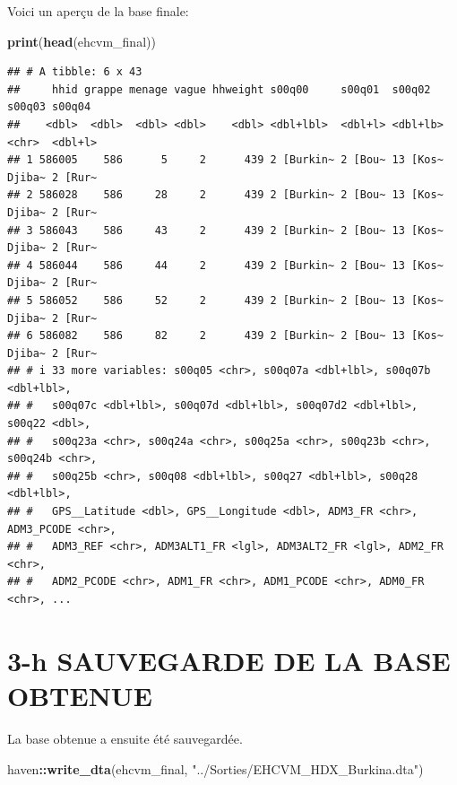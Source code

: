 \documentclass[
]{article}
\newenvironment{Shaded}{\begin{snugshade}}{\end{snugshade}}
\newcommand{\FunctionTok}[1]{\textcolor[rgb]{0.13,0.29,0.53}{\textbf{#1}}}
\newcommand{\NormalTok}[1]{#1}
\newcommand{\SpecialCharTok}[1]{\textcolor[rgb]{0.81,0.36,0.00}{\textbf{#1}}}
\newcommand{\StringTok}[1]{\textcolor[rgb]{0.31,0.60,0.02}{#1}}
\begin{document}
Voici un aperçu de la base finale:

\begin{Shaded}
\begin{Highlighting}[]
\FunctionTok{print}\NormalTok{(}\FunctionTok{head}\NormalTok{(ehcvm\_final))}
\end{Highlighting}
\end{Shaded}

\begin{verbatim}
## # A tibble: 6 x 43
##     hhid grappe menage vague hhweight s00q00     s00q01  s00q02   s00q03 s00q04 
##    <dbl>  <dbl>  <dbl> <dbl>    <dbl> <dbl+lbl>  <dbl+l> <dbl+lb> <chr>  <dbl+l>
## 1 586005    586      5     2      439 2 [Burkin~ 2 [Bou~ 13 [Kos~ Djiba~ 2 [Rur~
## 2 586028    586     28     2      439 2 [Burkin~ 2 [Bou~ 13 [Kos~ Djiba~ 2 [Rur~
## 3 586043    586     43     2      439 2 [Burkin~ 2 [Bou~ 13 [Kos~ Djiba~ 2 [Rur~
## 4 586044    586     44     2      439 2 [Burkin~ 2 [Bou~ 13 [Kos~ Djiba~ 2 [Rur~
## 5 586052    586     52     2      439 2 [Burkin~ 2 [Bou~ 13 [Kos~ Djiba~ 2 [Rur~
## 6 586082    586     82     2      439 2 [Burkin~ 2 [Bou~ 13 [Kos~ Djiba~ 2 [Rur~
## # i 33 more variables: s00q05 <chr>, s00q07a <dbl+lbl>, s00q07b <dbl+lbl>,
## #   s00q07c <dbl+lbl>, s00q07d <dbl+lbl>, s00q07d2 <dbl+lbl>, s00q22 <dbl>,
## #   s00q23a <chr>, s00q24a <chr>, s00q25a <chr>, s00q23b <chr>, s00q24b <chr>,
## #   s00q25b <chr>, s00q08 <dbl+lbl>, s00q27 <dbl+lbl>, s00q28 <dbl+lbl>,
## #   GPS__Latitude <dbl>, GPS__Longitude <dbl>, ADM3_FR <chr>, ADM3_PCODE <chr>,
## #   ADM3_REF <chr>, ADM3ALT1_FR <lgl>, ADM3ALT2_FR <lgl>, ADM2_FR <chr>,
## #   ADM2_PCODE <chr>, ADM1_FR <chr>, ADM1_PCODE <chr>, ADM0_FR <chr>, ...
\end{verbatim}

\section{3-h SAUVEGARDE DE LA BASE
OBTENUE}\label{h-sauvegarde-de-la-base-obtenue}

La base obtenue a ensuite été sauvegardée.

\begin{Shaded}
\begin{Highlighting}[]
\NormalTok{haven}\SpecialCharTok{::}\FunctionTok{write\_dta}\NormalTok{(ehcvm\_final, }\StringTok{"../Sorties/EHCVM\_HDX\_Burkina.dta"}\NormalTok{)}
\end{Highlighting}
\end{Shaded}
\end{document}
